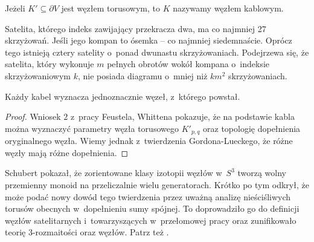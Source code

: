 \begin{definition}
	Jeżeli $K' \subseteq \partial V$ jest węzłem torusowym,	to $K$ nazywamy węzłem kablowym.
\end{definition}

Satelita, którego indeks zawijający przekracza dwa, ma co najmniej 27 skrzyżowań.
Jeśli jego kompan to ósemka -- co najmniej siedemnaście.
Oprócz tego istnieją cztery satelity o~ponad dwunastu skrzyżowaniach.
Podejrzewa się, że satelita, który wykonuje $m$ pełnych obrotów wokół kompana o~indeksie skrzyżowaniowym $k$, nie posiada diagramu o~mniej niż $km^2$ skrzyżowaniach.

\begin{proposition}
	Każdy kabel wyznacza jednoznacznie węzeł, z~którego powstał.
\end{proposition}

\begin{proof}
	Wniosek 2 z~pracy \cite{feustel78} Feustela, Whittena pokazuje, że na podstawie kabla można wyznaczyć parametry węzła torusowego $K'_{p,q}$ oraz topologię dopełnienia oryginalnego węzła.
	Wiemy jednak z~twierdzenia Gordona-Lueckego, że różne węzły mają różne dopełnienia.
\end{proof}

Schubert pokazał, że zorientowane klasy izotopii węzłów w~$S^3$ tworzą wolny przemienny monoid na przeliczalnie wielu generatorach.
Krótko po tym odkrył, że może podać nowy dowód tego twierdzenia przez uważną analizę nieściśliwych torusów obecnych w~dopełnieniu sumy spójnej.
To doprowadziło go do definicji węzłów satelitarnych i~towarzyszących w~przełomowej pracy \cite{schubert53} oraz zunifikowało teorię 3-rozmaitości oraz węzłów.
Patrz też \cite{motegi97}.

